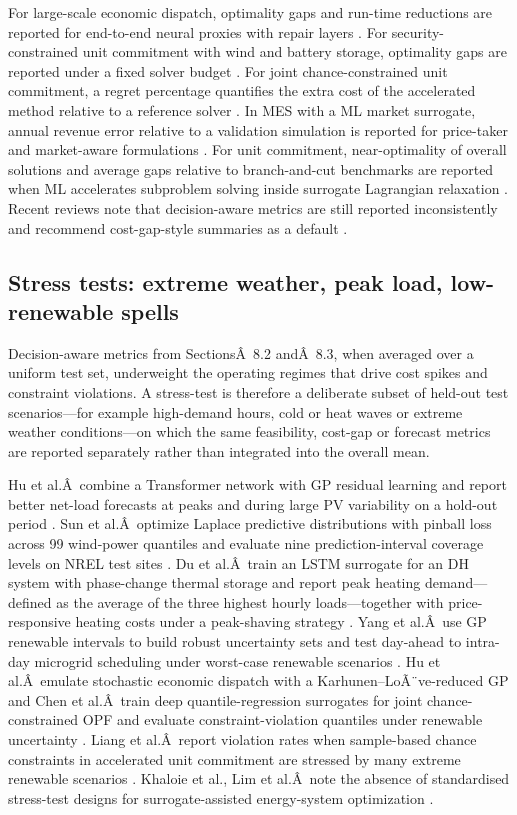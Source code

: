 \documentclass[final,5p,times,twocolumn]{elsarticle}
\begin{document}
For large-scale economic dispatch, optimality gaps and run-time
reductions are reported for end-to-end neural proxies with repair layers
\cite{Chen20244723}. For security-constrained unit commitment with wind and
battery storage, optimality gaps are reported under a fixed solver
budget \cite{Wu2022231}. For joint chance-constrained unit commitment, a
regret percentage quantifies the extra cost of the accelerated method
relative to a reference solver \cite{Liang20246508}. In MES with a ML market
surrogate, annual revenue error relative to a validation simulation is
reported for price-taker and market-aware formulations \cite{Jalving2023}.
For unit commitment, near-optimality of overall solutions and average
gaps relative to branch-and-cut benchmarks are reported when ML
accelerates subproblem solving inside surrogate Lagrangian relaxation
\cite{Wu2024391}. Recent reviews note that decision-aware metrics are still
reported inconsistently and recommend cost-gap-style summaries as a
default \cite{Ruan2021221,Khaloie2025,Lim2025}.

\subsection{Stress tests: extreme weather, peak load, low-renewable spells}
\label{sec:val:stress}

Decision-aware metrics from
SectionsÂ~8.2
andÂ~8.3, when averaged over a uniform test set,
underweight the operating regimes that drive cost spikes and constraint
violations. A stress-test is therefore a deliberate subset of held-out
test scenarios---for example high-demand hours, cold or heat waves or
extreme weather conditions---on which the same feasibility, cost-gap or
forecast metrics are reported separately rather than integrated into the
overall mean.

Hu et al.Â~combine a Transformer network with GP residual learning and
report better net-load forecasts at peaks and during large PV
variability on a hold-out period \cite{Hu2024}. Sun et al.Â~optimize Laplace
predictive distributions with pinball loss across 99 wind-power
quantiles and evaluate nine prediction-interval coverage levels on NREL
test sites \cite{Sun20191497}. Du et al.Â~train an LSTM surrogate for an DH
system with phase-change thermal storage and report peak heating
demand---defined as the average of the three highest hourly
loads---together with price-responsive heating costs under a
peak-shaving strategy \cite{Du2025}. Yang et al.Â~use GP renewable intervals
to build robust uncertainty sets and test day-ahead to intra-day
microgrid scheduling under worst-case renewable scenarios
\cite{Yang2024__2}. Hu et al.Â~emulate stochastic economic dispatch with a
Karhunen--LoÃ¨ve-reduced GP and Chen et al.Â~train deep
quantile-regression surrogates for joint chance-constrained OPF and
evaluate constraint-violation quantiles under renewable uncertainty
\cite{Chen2023657}. Liang et al.Â~report violation rates when sample-based
chance constraints in accelerated unit commitment are stressed by many
extreme renewable scenarios \cite{Liang20246508}. Khaloie et al., Lim et
al.Â~note the absence of standardised stress-test
designs for surrogate-assisted energy-system optimization
\cite{Khaloie2025,Lim2025}.
\end{document}
